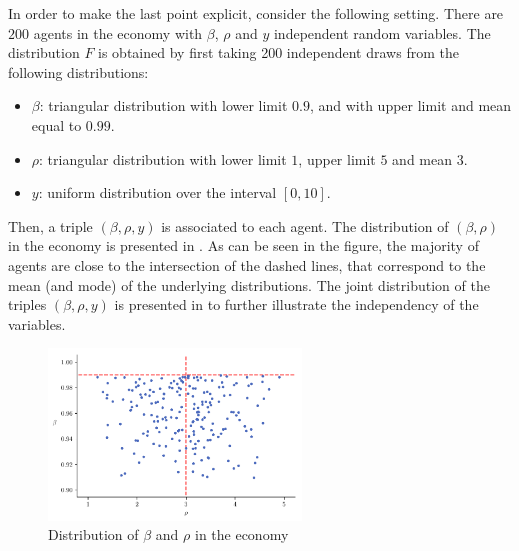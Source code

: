 \documentclass[english, a4paper, 12pt]{article}
\begin{document}
In order to make the last point explicit, consider the following setting. There are $200$ agents in the economy with $\beta$, $\rho$ and $y$ independent random variables. The distribution $F$ is obtained by first taking 200 independent draws from the following distributions:
	\begin{itemize}
		\item $\beta$: triangular distribution with lower limit $0.9$, and with upper limit and mean equal to $0.99$.
		\item $\rho$: triangular distribution with lower limit $1$, upper limit $5$ and mean $3$.
		\item $y$: uniform distribution over the interval $[0,10]$. 
	\end{itemize}

Then, a triple $(\beta,\rho,y)$ is associated to each agent. The distribution of $(\beta,\rho)$ in the economy is presented in . As can be seen in the figure, the majority of agents are close to the intersection of the dashed lines, that correspond to the mean (and mode) of the underlying distributions. The joint distribution of the triples $(\beta,\rho,y)$ is presented in  to further illustrate the independency of the variables.
	\begin{figure}[H]
		\caption{Distribution of $\beta$ and $\rho$ in the economy}
		\label{fig:distribBetaRho}
		\includegraphics[width=0.6\textwidth]{CarrollDistrib}
	\end{figure}
\end{document}
